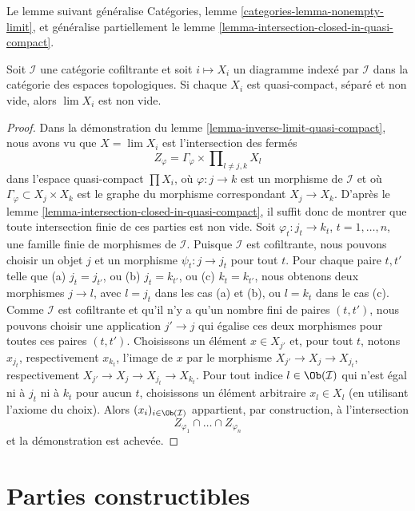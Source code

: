 \noindent
Le lemme suivant généralise Catégories,
lemme \ref{categories-lemma-nonempty-limit}, et généralise partiellement le
lemme \ref{lemma-intersection-closed-in-quasi-compact}.

\begin{lemma}
\label{lemma-nonempty-limit}
Soit $\mathcal{I}$ une catégorie cofiltrante et soit $i \mapsto X_i$ un
diagramme indexé par $\mathcal{I}$ dans la catégorie des espaces
topologiques. Si chaque $X_i$ est quasi-compact, séparé et non vide, alors
$\lim X_i$ est non vide.
\end{lemma}

\begin{proof}
Dans la démonstration du lemme \ref{lemma-inverse-limit-quasi-compact}, nous
avons vu que $X = \lim X_i$ est l'intersection des fermés
$$
Z_\varphi = \Gamma_\varphi \times \prod\nolimits_{l \not = j, k} X_l
$$
dans l'espace quasi-compact $\prod X_i$, où $\varphi : j \to k$ est un
morphisme de $\mathcal{I}$ et où $\Gamma_\varphi \subset X_j \times X_k$
est le graphe du morphisme correspondant $X_j \to X_k$. D'après le
lemme \ref{lemma-intersection-closed-in-quasi-compact}, il suffit donc de
montrer que toute intersection finie de ces parties est non vide.
Soit $\varphi_t : j_t \to k_t$, $t = 1, \ldots, n$, une famille finie de
morphismes de $\mathcal{I}$. Puisque $\mathcal{I}$ est cofiltrante, nous
pouvons choisir un objet $j$ et un morphisme $\psi_t : j \to j_t$ pour tout
$t$. Pour chaque paire $t, t'$ telle que (a) $j_t = j_{t'}$, ou
(b) $j_t = k_{t'}$, ou (c) $k_t = k_{t'}$, nous obtenons deux morphismes
$j \to l$, avec $l = j_t$ dans les cas (a) et (b), ou $l = k_t$ dans le cas
(c). Comme $\mathcal{I}$ est cofiltrante et qu'il n'y a qu'un nombre fini de
paires $(t, t')$, nous pouvons choisir une application $j' \to j$ qui égalise
ces deux morphismes pour toutes ces paires $(t, t')$. Choisissons un élément
$x \in X_{j'}$ et, pour tout $t$, notons $x_{j_t}$, respectivement
$x_{k_t}$, l'image de $x$ par le morphisme $X_{j'} \to X_j \to X_{j_t}$,
respectivement $X_{j'} \to X_j \to X_{j_t} \to X_{k_t}$.
Pour tout indice $l \in \Ob(\mathcal{I})$ qui n'est égal ni à $j_t$ ni à
$k_t$ pour aucun $t$, choisissons un élément arbitraire $x_l \in X_l$ (en
utilisant l'axiome du choix). Alors $(x_i)_{i \in \Ob(\mathcal{I})}$ appartient, par
construction, à l'intersection
$$
Z_{\varphi_1} \cap \ldots \cap Z_{\varphi_n}
$$
et la démonstration est achevée.
\end{proof}


\section{Parties constructibles}
\label{section-constructible}

